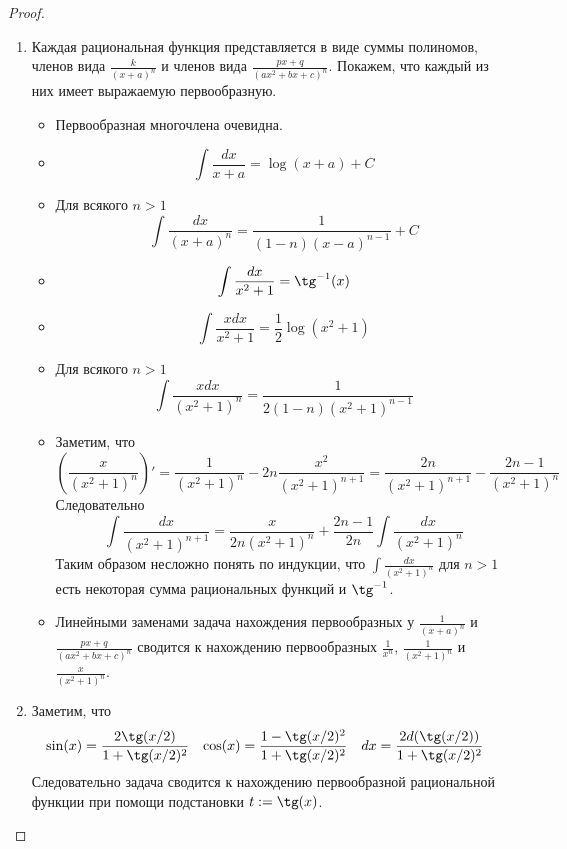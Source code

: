 \documentclass[12pt,a4paper]{article}
\begin{document}
    \begin{proof}
        \begin{enumerate}
            \item Каждая рациональная функция представляется в виде суммы полиномов, членов вида $\frac{k}{(x+a)^n}$ и членов вида $\frac{px+q}{(ax^2+bx+c)^n}$. Покажем, что каждый из них имеет выражаемую первообразную.
                \begin{itemize}
                    \item Первообразная многочлена очевидна.
                    \item \[\int \frac{dx}{x+a} = \log(x+a) + C\]
                    \item Для всякого $n > 1$
                        \[\int \frac{dx}{(x+a)^n} = \frac{1}{(1-n)(x-a)^{n-1}} + C\]
                    \item \[\int \frac{dx}{x^2+1} = \tg^{-1}(x)\]
                    \item \[\int \frac{xdx}{x^2+1} = \frac{1}{2} \log(x^2+1)\]
                    \item Для всякого $n > 1$
                        \[\int \frac{xdx}{(x^2 + 1)^n} = \frac{1}{2(1-n)(x^2+1)^{n-1}}\]
                    \item Заметим, что
                        \[
                            \left(\frac{x}{(x^2+1)^n}\right)'
                            = \frac{1}{(x^2+1)^n} - 2n \frac{x^2}{(x^2+1)^{n+1}}
                            = \frac{2n}{(x^2+1)^{n+1}} - \frac{2n-1}{(x^2+1)^n}
                        \]
                        Следовательно
                        \[\int \frac{dx}{(x^2+1)^{n+1}} = \frac{x}{2n(x^2+1)^n} + \frac{2n-1}{2n} \int \frac{dx}{(x^2+1)^n}\]
                        Таким образом несложно понять по индукции, что $\int \frac{dx}{(x^2+1)^n}$ для $n > 1$ есть некоторая сумма рациональных функций и $\tg^{-1}$.
                    \item Линейными заменами задача нахождения первообразных у $\frac{1}{(x+a)^n}$ и $\frac{px+q}{(ax^2+bx+c)^n}$ сводится к нахождению первообразных $\frac{1}{x^n}$, $\frac{1}{(x^2+1)^n}$ и $\frac{x}{(x^2+1)^n}$.
                \end{itemize}

            \item Заметим, что
                \begin{align*}
                    \sin(x) &= \frac{2 \tg(x/2)}{1 + \tg(x/2)^2}&
                    \cos(x) &= \frac{1 - \tg(x/2)^2}{1 + \tg(x/2)^2}&
                    dx &= \frac{2d(\tg(x/2))}{1+\tg(x/2)^2}
                \end{align*}
                Следовательно задача сводится к нахождению первообразной рациональной функции при помощи подстановки $t := \tg(x)$.


\end{enumerate}
\end{proof}
\end{document}
